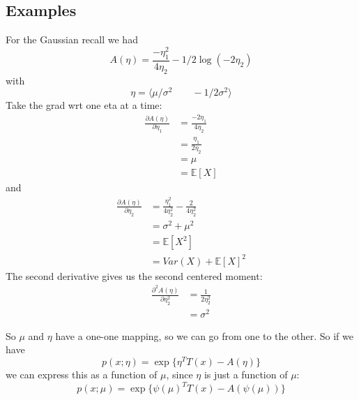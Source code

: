 \documentclass{article}
\newcommand{\E}{\mathbb{E}}
\begin{document}
\subsection{Examples}

For the Gaussian recall we had
$$
	A(\eta) = 
	\frac{-\eta_1^2}
	{4\eta_2}
	-
	1/2 \log(-2\eta_2)
$$
with 
$$
	\eta = \langle
	\mu/\sigma^2
	\qquad
	-1/2\sigma^2
	 \rangle
$$
Take the grad wrt one eta at a time:
\begin{align*}
\frac{\partial A(\eta)}
{\partial \eta_1}
&=
\frac{-2\eta_1}
{4\eta_2}
\\
&=
\frac{\eta_1}
{2\eta_2}
\\
&=
\mu
\\
&=
\E[X]
\end{align*}
and
\begin{align*}
\frac{\partial A(\eta)}
{\partial \eta_2}
&=
\frac{\eta_1^2}
{4\eta_2^2}
-
\frac{2}
{4\eta_2^2}
\\
&=
\sigma^2 + \mu^2
\\
&=
\E[X^2]
\\
&=
Var(X)
+
\E[X]^2
\end{align*}
The second derivative gives us the second centered moment:
\begin{align*}
\frac{\partial^2 A(\eta)}
{\partial \eta_2^2}
&=
\frac{1}
{2\eta_2^2}
\\
&=
\sigma^2
\end{align*}

So $\mu$ and $\eta$ have a one-one mapping, so we can go from one to the other.
So if we have
$$
p(x;\eta)
=
\exp\{
\eta^T T(x) - A(\eta)
\}
$$
we can express this as a function of $\mu$, since $\eta$ is just a function of $\mu$:
$$
p(x;\mu)
=
\exp\{
\psi(\mu)^T T(x) - A(\psi(\mu))
\}
$$
\end{document}
